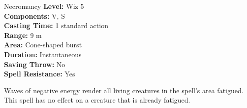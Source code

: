 {Necromancy}
{
	\textbf{Level:}
	Wiz 5\\
	\textbf{Components:}
	V, S\\
	\textbf{Casting Time:}
	1 standard action\\
	\textbf{Range:}
	9 m\\
	\textbf{Area:}
	Cone-shaped burst\\
	\textbf{Duration:}
	Instantaneous\\
	\textbf{Saving Throw:}
	No\\
	\textbf{Spell Resistance:}
	Yes\\
}
{
	Waves of negative energy render all living creatures in the spell's area fatigued. This spell has no effect on a creature that is already fatigued.

}

